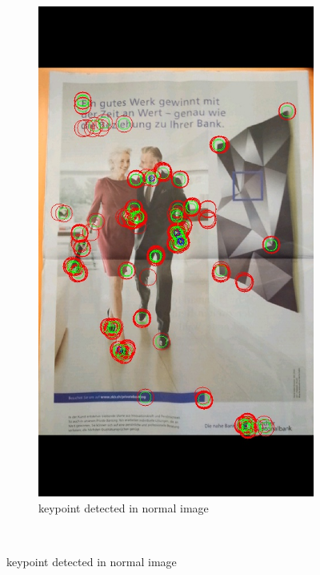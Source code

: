 \documentclass[10pt,conference,compsocconf]{IEEEtran}
\begin{document}
\begin{figure}[!ht]
        \centering
        \begin{subfigure}[b]{0.2\textwidth}
                \includegraphics[width=\textwidth]{badly2}
                \caption{keypoint detected in normal image}
                \label{fig:badly2}
        \end{subfigure}%
        ~ %

\end{figure}
\end{document}
